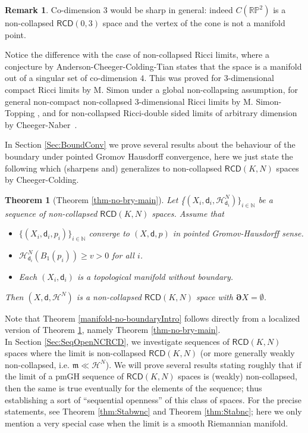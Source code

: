 \documentclass[a4paper]{amsart}
\newcounter{assu}
\theoremstyle{plain}
\newtheorem{theorem}[lemma]{Theorem}
\theoremstyle{definition}
\newtheorem{remark}[lemma]{Remark}
\numberwithin{equation}{section}
\newcommand{\RP}{\mathbb{RP}}
\newcommand{\N}{\mathbb{N}}
\newcommand{\RCD}{\mathsf{RCD}}
\newcommand{\mm}{\mathfrak m}
\newcommand{\sfd}{\mathsf d}
\newcommand{\cH}{\mathcal{H}}
\newcommand{\bRCD}{\boldsymbol\partial}
\begin{document}
{\begin{remark}\label{rem:CoDim3Top}
Co-dimension 3 would be sharp in general: indeed $C(\RP^{2})$  is a non-collapsed $\RCD(0,3)$ space and the vertex of the cone is not a manifold point.

Notice the difference with the case of non-collapsed Ricci limits, where a conjecture by Anderson-Cheeger-Colding-Tian states that the space is a manifold out of a singular set of co-dimension $4$. This was proved for 3-dimensional compact Ricci limits by M. Simon \cite{Sim} under a global non-collapsing assumption, for general non-compact non-collapsed 3-dimensional Ricci limits by M. Simon-Topping \cite{SimTop}, and for non-collapsed Ricci-double sided limits of arbitrary dimension by Cheeger-Naber~\cite{Ch-Na-codim4}.
\end{remark}

In Section \ref{Sec:BoundConv} we prove several results about the behaviour of the boundary under pointed Gromov Hausdorff convergence, here we just state the following  which { (sharpens and)} generalizes  to non-collapsed $\RCD(K,N)$ spaces   \cite[Theorem 6.1]{CC97}  by Cheeger-Colding.


\begin{theorem}[Theorem \ref{thm-no-bry-main}]\label{thm-no-bry-mainIntro} 
Let \{$(X_{i}, \sfd_{i}, \cH^{N}_{\sfd_{i}})\}_{i\in \N}$ be a sequence of non-collapsed $\RCD(K,N)$ spaces. Assume that
\begin{itemize}
\item $\{(X_{i}, \sfd_{i}, p_{i})\}_{i\in \N}$ converge to  $(X, \sfd, p)$ in pointed Gromov-Hausdorff sense.
\item $\cH^{N}_{\sfd_{i}}(B_1(p_i))\ge v>0$ for all $i$.
\item Each $(X_{i},\sfd_{i})$ is a topological manifold without boundary.
\end{itemize}
Then $(X, \sfd, \cH^{N})$ is a non-collapsed $\RCD(K,N)$ space with  $\bRCD X =\emptyset$.
\end{theorem}
 Note that Theorem \ref{manifold-no-boundaryIntro} follows directly from a localized version of Theorem \ref{thm-no-bry-mainIntro}, namely Theorem \ref{thm-no-bry-main}. 
 \\




In Section \ref{Sec:SeqOpenNCRCD}, we investigate sequences of $\RCD(K,N)$ spaces where the limit is non-collapsed $\RCD(K,N)$ (or more generally weakly non-collapsed, i.e. $\mm\ll\cH^{N}$). We will  prove  several results stating roughly that if the limit  of a pmGH sequence of $\RCD(K,N)$ spaces is  (weakly) non-collapsed, then the same is true  eventually for the elements of the sequence; thus establishing a sort of ``sequential openness'' of this class of spaces. For the precise statements, see Theorem \ref{thm:Stabwnc} and Theorem \ref{thm:Stabnc}; here we only mention a very special case when the limit is a smooth Riemannian manifold.

}
\end{document}
